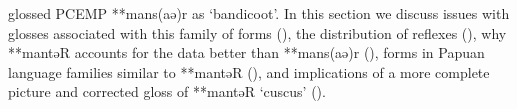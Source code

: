 \citet{Blust1982,Blust2012b} glossed PCEMP **mans(aə)r as ‘bandicoot’.
In this section we discuss issues with glosses associated with
this family of forms (),
the distribution of reflexes (),
why **mantəR accounts for the data better than **mans(aə)r (),
forms in Papuan language families similar to **mantəR (),
and implications of a more complete picture
and corrected gloss of **mantəR ‘cuscus’ ().